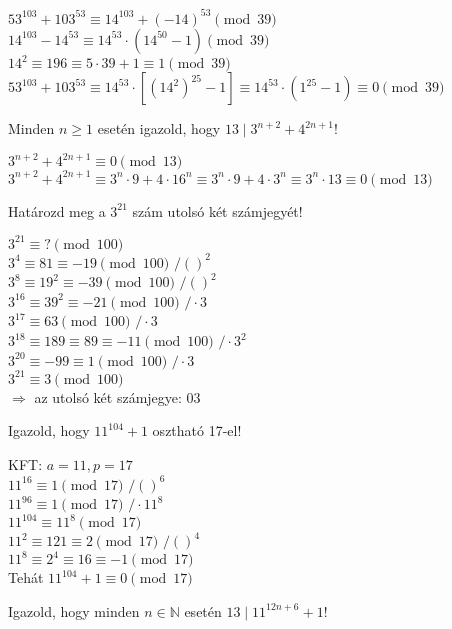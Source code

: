 \begin{solution}
	$53^{103}+103^{53}\equiv14^{103}+(-14)^{53}\pmod{39}$\\
	$14^{103}-14^{53}\equiv14^{53}\cdot(14^{50}-1)\pmod{39}$\\
	$14^{2}\equiv196\equiv5\cdot39+1\equiv1\pmod{39}$\\
	$53^{103}+103^{53}\equiv14^{53}\cdot[(14^{2})^{25}-1]\equiv14^{53}\cdot(1^{25}-1)\equiv0\pmod{39}$\\
	
\end{solution}
\begin{problem}
	Minden $n\geq1$ esetén igazold, hogy $13\mid3^{n+2}+4^{2n+1}$! 
\end{problem}

\begin{solution}
	$3^{n+2}+4^{2n+1}\equiv0\pmod{13}$\\
	$3^{n+2}+4^{2n+1}\equiv3^{n}\cdot9+4\cdot16^{n}\equiv3^{n}\cdot9+4\cdot3^{n}\equiv3^{n}\cdot13\equiv0\pmod{13}$\\
	
\end{solution}
\begin{problem}
	Határozd meg a $3^{21}$ szám utolsó két számjegyét! 
\end{problem}

\begin{solution}
	$3^{21}\equiv?\pmod{100}$\\
	$3^{4}\equiv81\equiv-19\pmod{100}$ $/()^{2}$\\
	$3^{8}\equiv19^{2}\equiv-39\pmod{100}$ $/()^{2}$\\
	$3^{16}\equiv39^{2}\equiv-21\pmod{100}$ $/\cdot3$\\
	$3^{17}\equiv63\pmod{100}$ $/\cdot3$\\
	$3^{18}\equiv189\equiv89\equiv-11\pmod{100}$ $/\cdot3^{2}$\\
	$3^{20}\equiv-99\equiv1\pmod{100}$ $/\cdot3$\\
	$3^{21}\equiv3\pmod{100}$\\
	$\Rightarrow$ az utolsó két számjegye: $03$ 
\end{solution}
\begin{problem}
	Igazold, hogy $11^{104}+1$ osztható 17-el! 
\end{problem}

\begin{solution}
	KFT: $a=11,p=17$\\
	$11^{16}\equiv1\pmod{17}$ $/()^{6}$\\
	$11^{96}\equiv1\pmod{17}$ $/\cdot11^{8}$\\
	$11^{104}\equiv11^{8}\pmod{17}$\\
	$11^{2}\equiv121\equiv2\pmod{17}$ $/()^{4}$\\
	$11^{8}\equiv2^{4}\equiv16\equiv-1\pmod{17}$\\
	Tehát $11^{104}+1\equiv0\pmod{17}$ 
\end{solution}
\begin{problem}
	Igazold, hogy minden $n\in\mathbb{N}$ esetén $13\mid11^{12n+6}+1$! 
\end{problem}

